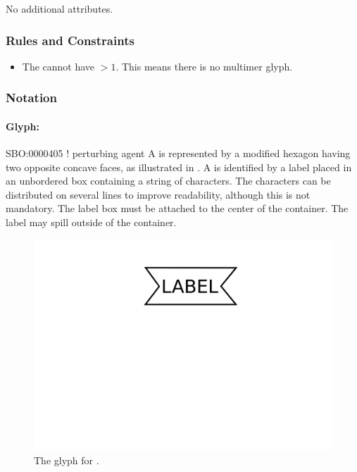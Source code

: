No additional attributes.

\subsubsection{Rules and Constraints}

\begin{itemize}
\item The  cannot have  $>
  1$. This means there is no multimer glyph.
\end{itemize}

\subsubsection{Notation}

\paragraph{Glyph: }

\begin{glyphDescription}
\glyphSboTerm SBO:0000405 ! perturbing agent
\glyphContainer A  is represented by a modified hexagon
having two opposite concave faces, as illustrated in .
\glyphLabel A  is identified by a label placed in an
unbordered box containing a string of characters.  The characters can be
distributed on several lines to improve readability, although this is not
mandatory.  The label box must be attached to the center of the
 container.  The label may spill outside of the container.
\end{glyphDescription}

\begin{figure}[H]
  \centering
  \includegraphics[scale = 0.3]{images/perturbing_agent}
  \caption{The \PD glyph for .}
  \label{fig:perturbing agent}
\end{figure}

